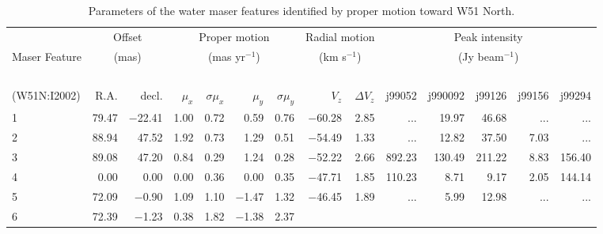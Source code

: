 \begin{table*}[p]
\caption{Parameters of the water maser features identified by 
proper motion toward W51 North.} \label{tab:pmotionsN}
{\scriptsize
\begin{tabular}{l@{ }r@{ \ }rr@{ \ }rr@{ \ }rrrr@{ \ }r@{ \ }r@{ \ }r@{ \ }r} \hline \hline
 & \multicolumn{2}{c}{Offset\footnotemark[2]}
 & \multicolumn{4}{c}{Proper motion\footnotemark[3]}
 & \multicolumn{2}{c}{Radial motion\footnotemark[4]}
 & \multicolumn{5}{c}{Peak intensity\footnotemark[5]} \\                                         
Maser Feature\footnotemark[1] & \multicolumn{2}{c}{(mas)} 
 & \multicolumn{4}{c}{(mas yr$^{-1}$)}
 & \multicolumn{2}{c}{(km s$^{-1}$)}
 & \multicolumn{5}{c}{(Jy beam$^{-1}$)} \\
 & \multicolumn{2}{c}{\ \hrulefill \ } 
 & \multicolumn{4}{c}{\ \hrulefill \ } 
 & \multicolumn{2}{c}{\ \hrulefill \ } 
 & \multicolumn{5}{c}{\ \hrulefill \ } \\                                        
(W51N:I2002) & R.A. & decl. 
 & $\mu_{x}$ & $\sigma \mu_{x}$ & $\mu_{y}$ 
 & $\sigma \mu_{y}$ & $V_{z}$ & $\Delta V_{z}$
 & j99052 & j990092 & j99126 & j99156 & j99294 \\  \hline
  1   \ \dotfill \  &     79.47 &   $-$22.41 &    1.00 &   0.72 &    0.59 &   0.76
 & $-$60.28 &   2.85
  &    ...     &       19.97 &       46.68 &    ...     &    ...       \\     
  2   \ \dotfill \  &     88.94 &     47.52 &    1.92 &   0.73 &    1.29 &   0.51
 & $-$54.49 &   1.33
  &    ...     &       12.82 &       37.50 &        7.03 &    ...       \\     
  3   \ \dotfill \  &     89.08 &     47.20 &    0.84 &   0.29 &    1.24 &   0.28
 & $-$52.22 &   2.66
  &      892.23 &      130.49 &      211.22 &        8.83 &      156.40   \\     
  4   \ \dotfill \  &      0.00 &      0.00 &    0.00 &   0.36 &    0.00 &   0.35
 & $-$47.71 &   1.85
  &      110.23 &        8.71 &        9.17 &        2.05 &      144.14   \\     
  5   \ \dotfill \  &     72.09 &    $-$0.90 &    1.09 &   1.10 &  $-$1.47 &   1.32
 & $-$46.45 &   1.89
  &    ...     &        5.99 &       12.98 &    ...     &    ...       \\     
  6   \ \dotfill \  &     72.39 &    $-$1.23 &    0.38 &   1.82 &  $-$1.38 &   2.37

\end{tabular}}
\end{table*}
